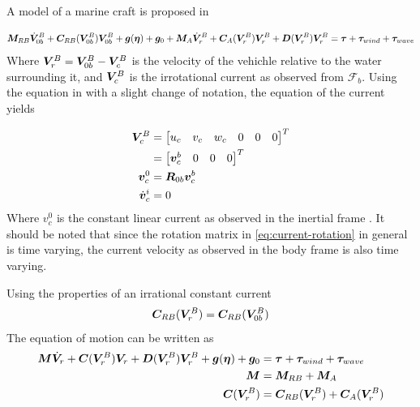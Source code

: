 A model of a marine craft is proposed in \cite{fs} 

\begin{align}
\boldsymbol M_{RB}\dot{\boldsymbol V}_{0b}^B + \boldsymbol C_{RB}(\boldsymbol V_{0b}^B)\boldsymbol V_{0b}^B + \boldsymbol g(\boldsymbol \eta) + \boldsymbol g_0 + \boldsymbol M_A \dot{\boldsymbol V}_{r}^B  + \boldsymbol C_A(\boldsymbol V_{r}^B) \boldsymbol V_{r}^B + \boldsymbol D(\boldsymbol V_{r}^B)\boldsymbol V_{r}^B = \boldsymbol \tau + \boldsymbol \tau_{wind} + \boldsymbol \tau_{wave} 
\label{eq:fossen1}
\end{align}
Where $ \boldsymbol V_{r}^B = \boldsymbol V_{0b}^B - \boldsymbol V_c^{B}$ is the velocity of the vehichle relative to the water surrounding it, and $ \boldsymbol V_{c}^{B}$ is the irrotational current as observed from $\mathcal F_b$. Using the equation in \cite{fs} with a slight change of notation, the equation of the current yields

\begin{align}
	\boldsymbol V_c^{B}&=\begin{bmatrix} u_c & v_c & w_c & 0 & 0 & 0\end{bmatrix}^T 
  \label{eq:current}
  \\
  &= \begin{bmatrix} \boldsymbol v_c^b & 0 & 0 & 0 \end{bmatrix}^T
  \\
  \boldsymbol v_c^0 &= \boldsymbol R_{0b}\boldsymbol v_c^b 
	\label{eq:current-rotation}
  \\
  \dot{\boldsymbol v}_c^i&=0
\end{align}
Where $v_{c}^{0}$ is the constant linear current as observed in the inertial frame . It should be noted that since the rotation matrix in \eqref{eq:current-rotation} in general is time varying, the current velocity as observed in the body frame is also time varying. 

Using the properties of an irrational constant current \cite{fs} 
\begin{align}
  \boldsymbol C_{RB}(\boldsymbol V_{r}^B) &= \boldsymbol C_{RB}(\boldsymbol V_{0b}^B) 
  \label{eq:irrational}\\
\end{align}
The equation of motion can be written as 
\begin{align}
  \boldsymbol M \dot{\boldsymbol V}_r + \boldsymbol C(\boldsymbol V_{r}^B)\boldsymbol V_r + \boldsymbol D(\boldsymbol V_{r}^B)\boldsymbol V_{r}^B +  \boldsymbol g(\boldsymbol \eta) + \boldsymbol g_0  &= \boldsymbol \tau + \boldsymbol \tau_{wind} + \boldsymbol \tau_{wave} 
  \label{eq:fossen2}\\
  \boldsymbol M &= \boldsymbol M_{RB} + \boldsymbol M_A
  \label{eq:massCol} \\
  \boldsymbol C(\boldsymbol V_r^B) &= \boldsymbol C_{RB}(\boldsymbol V_r^B)+ \boldsymbol C_A(\boldsymbol V_r^B)
\end{align}


